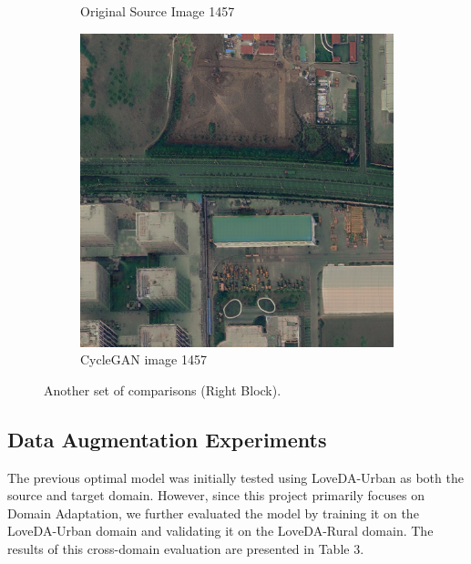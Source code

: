 \documentclass[10pt,twocolumn,letterpaper]{article}
\begin{document}
{\begin{figure}[t]
\begin{minipage}{0.48\textwidth}
\begin{subfigure}[b]{0.45\textwidth}
                \caption{Original Source Image 1457}
            \end{subfigure}
            \hspace{2mm}
            \begin{subfigure}[b]{0.45\textwidth}
                \includegraphics[width=\textwidth]{images/1457_fake.png}
                \caption{CycleGAN image 1457}
            \end{subfigure}
            \caption{Another set of comparisons (Right Block).}
            \label{fig:right_block}
        \end{minipage}
    \end{figure}
}



\subsection{Data Augmentation Experiments}

The previous optimal model was initially tested using LoveDA-Urban as both the source and target domain. However, since this project primarily focuses on Domain Adaptation, we further evaluated the model by training it on the LoveDA-Urban domain and validating it on the LoveDA-Rural domain. The results of this cross-domain evaluation are presented in Table 3.
\end{document}
